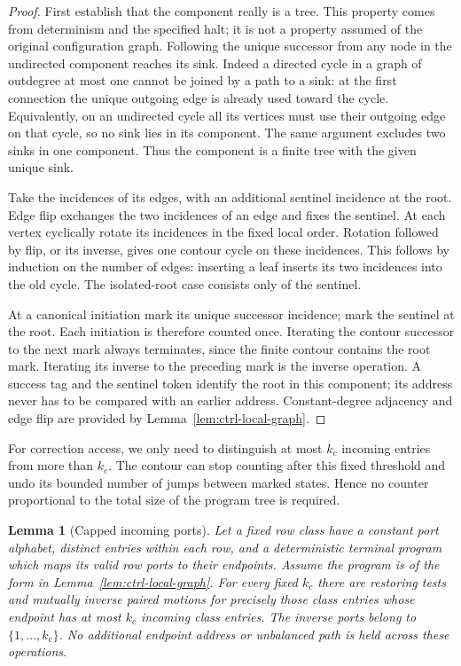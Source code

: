 \documentclass[11pt]{article}
\numberwithin{equation}{section}
\newtheorem{lemma}[theorem]{Lemma}
\theoremstyle{definition}
\theoremstyle{remark}
\begin{document}
\begin{proof}
First establish that the component really is a tree. This property comes from determinism and the specified halt; it is not a property assumed of the original configuration graph. Following the unique successor from any node in the undirected
component reaches its sink.  Indeed a directed cycle in a graph of
outdegree at most one cannot be joined by a path to a sink: at the
first connection the unique outgoing edge is already used toward the
cycle.  Equivalently, on an undirected cycle all its vertices must use
their outgoing edge on that cycle, so no sink lies in its component.
The same argument excludes two sinks in one component.  Thus the
component is a finite tree with the given unique sink.

Take the incidences of its edges, with an additional sentinel incidence
at the root.  Edge flip exchanges the two incidences of an edge and
fixes the sentinel.  At each vertex cyclically rotate its incidences in
the fixed local order.  Rotation followed by flip, or its inverse,
gives one contour cycle on these incidences.  This follows by induction
on the number of edges: inserting a leaf inserts its two incidences
into the old cycle.  The isolated-root case consists only of the
sentinel.

At a canonical initiation mark its unique successor incidence; mark
the sentinel at the root.  Each initiation is therefore counted once.
Iterating the contour successor to the next mark always terminates,
since the finite contour contains the root mark.  Iterating its inverse
to the preceding mark is the inverse operation.  A success tag and the
sentinel token identify the root in this component; its address never
has to be compared with an earlier address.  Constant-degree adjacency
and edge flip are provided by Lemma~\ref{lem:ctrl-local-graph}.
\end{proof}

For correction access, we only need to distinguish at most ${k}_c$ incoming entries from more than ${k}_c$. The contour can stop counting after this fixed threshold and undo its bounded number of jumps between marked states. Hence no counter proportional to the total size of the program tree is required.

\begin{lemma}[Capped incoming ports]\label{lem:ctrl-cap}
Let a fixed row class have a constant port alphabet, distinct entries
within each row, and a deterministic terminal program which maps its
valid row ports to their endpoints.  Assume the program is of the form
in Lemma~\ref{lem:ctrl-local-graph}.  For every fixed ${k}_c$ there are
restoring tests and mutually inverse paired motions for precisely those
class entries whose endpoint has at most ${k}_c$ incoming class entries.
The inverse ports belong to $\{1,\ldots,{k}_c\}$.  No additional endpoint
address or unbalanced path is held across these operations.
\end{lemma}
\end{document}
